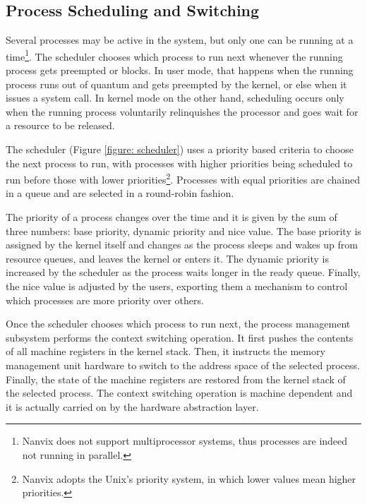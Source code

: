 \documentclass[10pt,a4paper]{article}
\begin{document}
\subsection{Process Scheduling and Switching}

Several processes may be active in the system, but only one can be running at a time\footnote{Nanvix does not support multiprocessor systems, thus processes are indeed not running in parallel.}. The scheduler chooses which process to run next whenever the running process gets preempted or blocks. In user mode, that happens when the running process runs out of quantum and gets preempted by the kernel, or else when it issues a system call. In kernel mode on the other hand, scheduling occurs only when the running process voluntarily relinquishes the processor and goes wait for a resource to be released.

The scheduler (Figure \ref{figure: scheduler}) uses a priority based criteria to choose the next process to run, with processes with higher priorities being scheduled to run before those with lower priorities\footnote{Nanvix adopts the Unix's priority system, in which lower values mean higher priorities.}. Processes with equal priorities are chained in a queue and are selected in a round-robin fashion.

The priority of a process changes over the time and it is given by the sum of three numbers: base priority, dynamic priority and nice value. The base priority is assigned by the kernel itself and changes as the process sleeps and wakes up from resource queues, and leaves the kernel or enters it. The dynamic priority is increased by the scheduler as the process waits longer in the ready queue. Finally, the nice value is adjusted by the users, exporting them a mechanism to control which processes are more priority over others.

Once the scheduler chooses which process to run next, the process management subsystem performs the context switching operation. It first pushes the contents of all machine registers in the kernel stack. Then, it instructs the memory management unit hardware to switch to the address space of the selected process. Finally, the state of the machine registers are restored from the kernel stack of the selected process. The context switching operation is machine dependent and it is actually carried on by the hardware abstraction layer.
\end{document}
